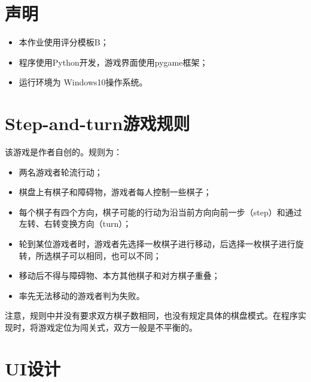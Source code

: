 \tableofcontents
\clearpage


\section{声明}
\begin{itemize}
\item 本作业使用评分模板B；
\item 程序使用{\ttfamily Python}开发，游戏界面使用{\ttfamily pygame}框架；
\item 运行环境为 {\ttfamily Windows10}操作系统。
\end{itemize}

\section{Step-and-turn游戏规则}
该游戏是作者自创的。规则为：
\begin{itemize}
	\item 两名游戏者轮流行动；
	\item 棋盘上有棋子和障碍物，游戏者每人控制一些棋子；
	\item 每个棋子有四个方向，棋子可能的行动为沿当前方向向前一步（step）和通过左转、右转变换方向（turn）；
	\item 轮到某位游戏者时，游戏者先选择一枚棋子进行移动，后选择一枚棋子进行旋转，所选棋子可以相同，也可以不同；
	\item 移动后不得与障碍物、本方其他棋子和对方棋子重叠；
	\item 率先无法移动的游戏者判为失败。
\end{itemize}

注意，规则中并没有要求双方棋子数相同，也没有规定具体的棋盘模式。在程序实现时，将游戏定位为闯关式，双方一般是不平衡的。

\section{UI设计}
